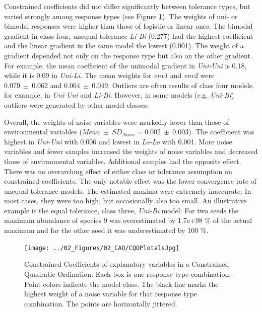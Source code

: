 	
	Constrained coefficients did not differ significantly between tolerance types, but varied strongly among response types (see Figure \ref{fig:cqoweights}).
	The weights of uni- or bimodal responses were higher than those of logistic or linear ones. 
	The bimodal gradient in class four, unequal tolerance \textit{Li-Bi} (0.277) had the highest coefficient and the linear gradient in the same model the lowest (0.001).
	The weight of a gradient depended not only on the response type but also on the other gradient.
	For example, the mean coefficient of the unimodal gradient in \textit{Uni-Uni} is 0.18, while it is 0.09 in \textit{Uni-Li}. 
	The mean weights for \textit{env1} and \textit{env2} were $0.079\ \pm\ 0.062$ and $0.064\ \pm\ 0.049$. 
	Outliers are often results of class four models, for example, in \textit{Uni-Uni} and \textit{Li-Bi}. 
	However, in some models (e.g. \textit{Uni-Bi}) outliers were generated by other model classes. 

	Overall, the weights of noise variables were markedly lower than those of environmental variables ($Mean\ \pm\ SD_{\scriptscriptstyle Noise} = 0.002\ \pm\ 0.003$).  
	The coefficient was highest in \textit{Uni-Uni} with 0.006 and lowest in \textit{Lo-Lo} with 0.001.
	More noise variables and fewer samples increased the weights of noise variables and decreased those of environmental variables. 
	Additional samples had the opposite effect. \\
	
	There was no overarching effect of either class or tolerance assumption on constrained coefficients. 
	The only notable effect was the lower convergence rate of unequal tolerance models.
	The estimated maxima were extremely inaccurate. 
	In most cases, they were too high, but occasionally also too small. 
	An illustrative example is the equal tolerance, class three, \textit{Uni-Bi} model: For two seeds the maximum abundance of species 9 was overestimated by 1.7e+98 \% of the actual maximum and for the other seed it was underestimated by 100 \%. 
	
	\begin{figure}[h!]
		\centering
		\texttt{[image: ../02\_Figures/02\_CAO/CQOPlotalsJpg]}
		\caption{Constrained Coefficients of explanatory variables in a Constrained Quadratic Ordination. Each box is one response type combination. Point colors indicate the model class. The black line marks the highest weight of a noise variable for that response type combination. The points are horizontally jittered. }
		\label{fig:cqoweights}
	\end{figure}
















